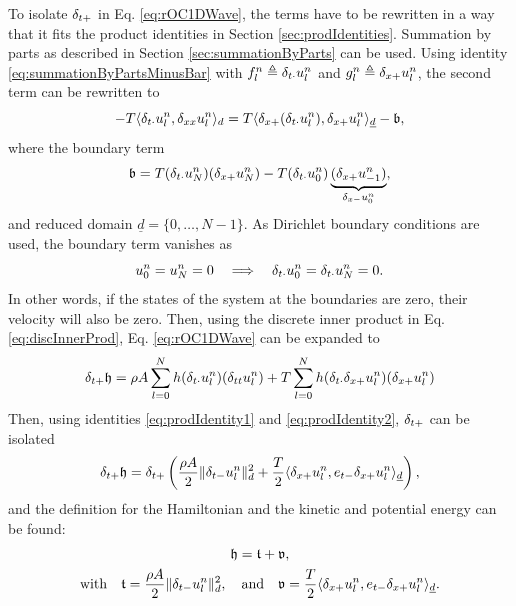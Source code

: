 {{{{To isolate $\delta_{t+}$ in Eq. \eqref{eq:rOC1DWave}, the terms have to be rewritten in a way that it fits the product identities in Section \ref{sec:prodIdentities}.
Summation by parts as described in Section \ref{sec:summationByParts}  can be used. Using identity \eqref{eq:summationByPartsMinusBar}  with $f_l^n \triangleq \delta_{t\cdot} u_l^n$ and $g_l^n \triangleq \delta_{x+} u_l^n$, the second term can be rewritten to 
%
\begin{equation*}
    - T \langle \delta_{t\cdot}u_l^n, \delta_{xx} u_l^n\rangle_d  = T\langle \delta_{x+}(\delta_{t\cdot}u_l^n), \delta_{x+}u_l^n\rangle_{\underline{d}} - \mathfrak{b},
\end{equation*}
where the boundary term
\begin{equation*}
    \mathfrak{b} = T(\delta_{t\cdot} u_N^n)(\delta_{x+} u_N^n) - T(\delta_{t\cdot} u_0^n) \underbrace{(\delta_{x+} u_{-1}^n)}_{\delta_{x-} u_0^n},
\end{equation*}
and reduced domain $\underline{d} = \{0, \hdots, N-1\}$. As Dirichlet boundary conditions are used, the boundary term vanishes as 
\begin{equation*}
    u_0^n = u_N^n = 0 \quad \Longrightarrow \quad \delta_{t\cdot} u_0^n = \delta_{t\cdot} u_N^n = 0.
\end{equation*}
In other words, if the states of the system at the boundaries are zero, their velocity will also be zero. 
Then, using the discrete inner product in Eq. \eqref{eq:discInnerProd}, Eq. \eqref{eq:rOC1DWave} can be expanded to
\begin{equation}
    \delta_{t+} \mathfrak{h} = \rho A \sum_{l = 0}^N h(\delta_{t\cdot} u_l^n)(\delta_{tt} u_l^n) + T \sum_{l = 0}^N h(\delta_{t\cdot} \delta_{x+} u_l^n)(\delta_{x+} u_l^n)
\end{equation}
Then, using identities \eqref{eq:prodIdentity1} and \eqref{eq:prodIdentity2}, $\delta_{t+}$ can be isolated 
\begin{equation}
    \delta_{t+} \mathfrak{h} = \delta_{t+} \left(\frac{\rho A}{2}\lVert\delta_{t-} u_l^n\rVert^2_d + \frac{T}{2}\langle\delta_{x+}u_l^n, e_{t-}\delta_{x+}u_l^n\rangle_{\underline{d}}\right),
\end{equation}
and the definition for the Hamiltonian and the kinetic and potential energy can be found:
\begin{equation}\label{eq:energyBalance1DWave}
    \begin{gathered}
        \mathfrak{h} = \mathfrak{t} + \mathfrak{v},\\
        \text{with}\quad \mathfrak{t} = \frac{\rho A}{2}\lVert\delta_{t-} u_l^n\rVert^2_d, \quad \text{and} \quad \mathfrak{v} = \frac{T}{2}\langle\delta_{x+}u_l^n, e_{t-}\delta_{x+}u_l^n\rangle_{\underline{d}}.
    \end{gathered}
\end{equation}

}}}}
